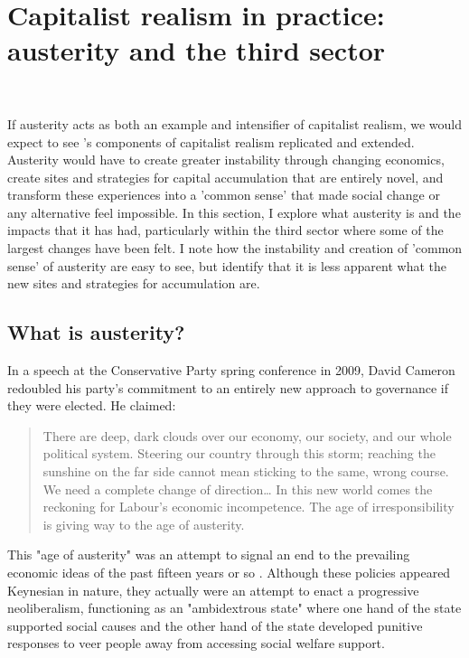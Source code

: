 \section{Capitalist realism in practice: austerity and the third sector}
\label{capitalist-realism-in-practice-austerity-and-the-third-sector}\
\


If austerity acts as both an example and intensifier of capitalist realism, we would expect to see \citet{shonkwiler_reading_2014}'s components of capitalist realism replicated and extended. Austerity would have to create greater instability through changing economics, create sites and strategies for capital accumulation that are entirely novel, and transform these experiences into a 'common sense' that made social change or any alternative feel impossible. In this section, I explore what austerity is and the impacts that it has had, particularly within the third sector where some of the largest changes have been felt. I note how the instability and creation of 'common sense' of austerity are easy to see, but identify that it is less apparent what the new sites and strategies for accumulation are.    

\subsection{What is austerity?}
\label{what-is-austerity}

In a speech at the Conservative Party spring conference in 2009, David Cameron redoubled his party's commitment to an entirely new approach to governance if they were elected. He claimed:

\begin{quote}
There are deep, dark clouds over our economy, our society, and our whole political system. Steering our country through this storm; reaching the sunshine on the far side cannot mean sticking to the same, wrong course. We need a complete change of direction\ldots{} In this new world comes the reckoning for Labour's economic incompetence. The age of irresponsibility is giving way to the age of austerity. \citep{cameron_age_2009}
\end{quote}

This "age of austerity" was an attempt to signal an end to the prevailing economic ideas of the past fifteen years or so \citep{blyth_austerity_2013}. Although these policies appeared Keynesian in nature, they actually were an attempt to enact a progressive neoliberalism, functioning as an "ambidextrous state" \citep[X]{peck_zombie_2010} where one hand of the state supported social causes and the other  hand of the state developed punitive responses to veer people away from accessing social welfare support.

